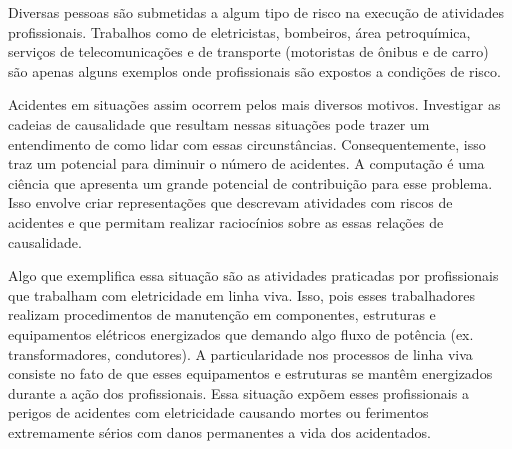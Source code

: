 Diversas pessoas são submetidas a algum tipo de risco na execução de atividades profissionais. Trabalhos como de eletricistas, bombeiros, área petroquímica, serviços de telecomunicações e de transporte (motoristas de ônibus e de carro) são apenas alguns exemplos onde profissionais são expostos a condições de risco.

Acidentes em situações assim ocorrem pelos mais diversos motivos. Investigar as cadeias de causalidade que resultam nessas situações pode trazer um entendimento de como lidar com essas circunstâncias. Consequentemente, isso traz um potencial para diminuir o número de acidentes. A computação é uma ciência que apresenta um grande potencial de contribuição para esse problema. Isso envolve criar representações que descrevam atividades com riscos de acidentes e que permitam realizar raciocínios sobre as essas relações de causalidade.

Algo que exemplifica essa situação são as atividades praticadas por profissionais que trabalham com eletricidade em linha viva. Isso, pois esses trabalhadores realizam procedimentos de manutenção em componentes, estruturas e equipamentos elétricos energizados que demando algo fluxo de potência (ex. transformadores, condutores). A particularidade nos processos de linha viva consiste no fato de que esses equipamentos e estruturas se mantêm energizados durante a ação dos profissionais. Essa situação expõem esses profissionais a perigos de acidentes com eletricidade causando mortes ou ferimentos extremamente sérios com danos permanentes a vida dos acidentados.  